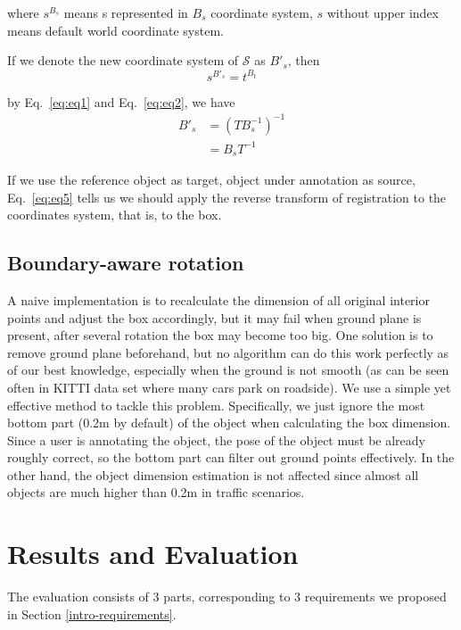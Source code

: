 \documentclass[letterpaper, 10 pt, conference]{ieeeconf}  %
\begin{document}
where $s^{B_s}$ means s represented in $B_s$ coordinate system, $s$ without upper index means default world coordinate system.

If we denote the new coordinate system of $\mathcal{S}$ as $B'_s$, then
\begin{equation} \label{eq:eq2}
s^{B'_s} = t^{B_t}
\end{equation}

by Eq.~\eqref{eq:eq1} and Eq.~\eqref{eq:eq2}, we have
\begin{align}
{B'_s} & = (T B_s^{-1})^{-1}\\
       & = B_s T^{-1} \label{eq:eq5}
\end{align}

If we use the reference object as target, object under annotation as source, Eq.~\eqref{eq:eq5} tells us we should apply the reverse transform of registration to the coordinates system, that is, to the box.


\subsection{Boundary-aware rotation}

A naive implementation is to recalculate the dimension of all original interior points and adjust the box accordingly, but it may fail when ground plane is present, after several rotation the box may become too big. One solution is to remove ground plane beforehand, but no algorithm can do this work perfectly as of our best knowledge, especially when the ground is not smooth (as can be seen often in KITTI data set\cite{Geiger2012CVPR} where many cars park on roadside). We use a simple yet effective method to tackle this problem. Specifically, we just ignore the most bottom part (0.2m by default) of the object when calculating the box dimension. Since a user is annotating the object, the pose of the object must be already roughly correct, so the bottom part can filter out ground points effectively. In the other hand, the object dimension estimation is not affected since almost all objects are much higher than 0.2m in traffic scenarios.


\section{Results and Evaluation}
\label {Metrics}

The evaluation consists of 3 parts, corresponding to 3 requirements we proposed in Section \ref{intro-requirements}.
\end{document}
